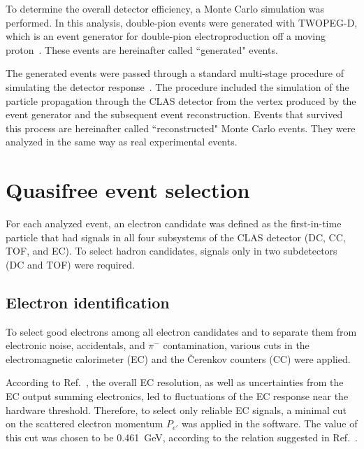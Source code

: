 \documentclass[prc,twocolumn,superscriptaddress,showpacs,amssymb,amsmath,amsfonts,aps,nofootinbib]{revtex4-1}
\begin{document}
To determine the overall detector efficiency, a Monte Carlo simulation was performed. In this analysis, double-pion events were generated with TWOPEG-D, which is an event generator for double-pion electroproduction off a moving proton~\cite{twopeg-d}. These events are hereinafter called ``generated" events. 

The generated events were passed through a standard multi-stage procedure of simulating the detector response~\cite{Mecking:2003zu}. The procedure included the simulation of the particle propagation through the CLAS detector from the vertex produced by the event generator and the subsequent event reconstruction. Events that survived this process are hereinafter called ``reconstructed" Monte Carlo events. They were analyzed in the same way as real experimental events. 


\section{Quasifree event selection}
\label{Sect:select}

For each analyzed event, an electron candidate was defined as the first-in-time particle that had signals in all four subsystems of the CLAS detector (DC, CC, TOF, and EC). To select hadron candidates, signals only in two subdetectors (DC and TOF) were required.

\subsection{Electron identification}

To select good electrons among all electron candidates and to separate them from electronic noise, accidentals, and $\pi^{-}$ contamination, various cuts in the electromagnetic calorimeter (EC) and the \v Cerenkov counters (CC) were applied.

According to Ref.\!~\cite{Egian:007}, the overall EC resolution, as well as uncertainties from the EC output summing electronics, led to fluctuations of the EC response near the hardware threshold. Therefore, to select only reliable EC signals, a minimal cut on the scattered electron momentum $P_{e'}$ was applied in the software. The value of this cut was chosen to be 0.461~GeV, according to the relation suggested in Ref.\!~\cite{Egian:007}.
\end{document}

